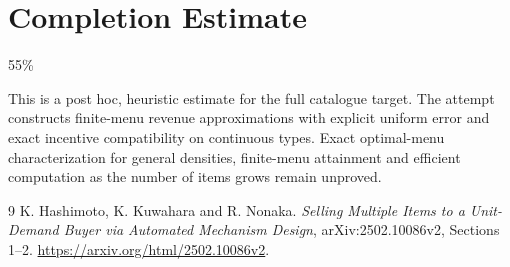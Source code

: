 \documentclass[11pt]{article}
\theoremstyle{definition}
\begin{document}
\section{Completion Estimate}
55\%

This is a post hoc, heuristic estimate for the full catalogue target.
The attempt constructs finite-menu revenue approximations with explicit uniform error and exact incentive compatibility on continuous types. Exact optimal-menu characterization for general densities, finite-menu attainment and efficient computation as the number of items grows remain unproved.

\begin{thebibliography}{9}
 K. Hashimoto, K. Kuwahara and R. Nonaka.
\emph{Selling Multiple Items to a Unit-Demand Buyer via Automated
Mechanism Design}, arXiv:2502.10086v2, Sections 1--2.
\url{https://arxiv.org/html/2502.10086v2}.
\end{thebibliography}
\end{document}
